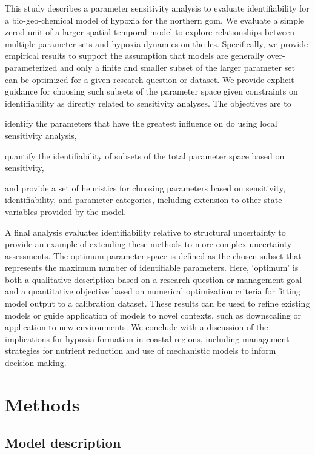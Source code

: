\documentclass[letterpaper,12pt,oneside]{article}\usepackage[]{graphicx}\usepackage[]{color}
\begin{document}
This study describes a parameter sensitivity analysis to evaluate identifiability for a bio-geo-chemical model of hypoxia for the northern \ac{gom}.  We evaluate a simple \ac{zerod} unit of a larger spatial-temporal model to explore relationships between multiple parameter sets and hypoxia dynamics on the \ac{lcs}.  Specifically, we provide empirical results to support the assumption that models are generally over-parameterized and only a finite and smaller subset of the larger parameter set can be optimized for a given research question or dataset.  We provide explicit guidance for choosing such subsets of the parameter space given constraints on identifiability as directly related to sensitivity analyses.  The objectives are to \begin{inparaenum}[1\upshape)]
\item identify the parameters that have the greatest influence on \ac{do} using local sensitivity analysis,
\item quantify the identifiability of subsets of the total parameter space based on sensitivity,
\item and provide a set of heuristics for choosing parameters based on sensitivity, identifiability, and parameter categories, including extension to other state variables provided by the model.
\end{inparaenum}
A final analysis evaluates identifiability relative to structural uncertainty to provide an example of extending these methods to more complex uncertainty assessments.  The optimum parameter space is defined as the chosen subset that represents the maximum number of identifiable parameters.  Here, `optimum' is both a qualitative description based on a research question or management goal and a quantitative objective based on numerical optimization criteria for fitting model output to a calibration dataset.  These results can be used to refine existing models or guide application of models to novel contexts, such as downscaling or application to new environments.  We conclude with a discussion of the implications for hypoxia formation in coastal regions, including management strategies for nutrient reduction and use of mechanistic models to inform decision-making.

\section{Methods}

\subsection{Model description}
\end{document}
